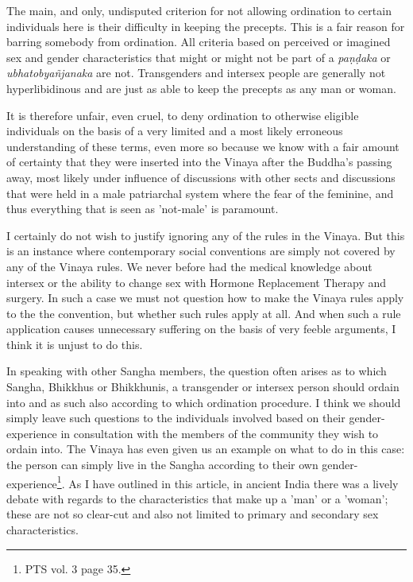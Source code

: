 The main, and only, undisputed criterion for not allowing ordination to certain individuals here is their difficulty in keeping the precepts. This is a fair reason for barring somebody from ordination. All criteria based on perceived or imagined sex and gender characteristics that might or might not be part of a {\em paṇḍaka} or {\em ubhatob­yañ­janaka} are not. Transgenders and intersex people are generally not hyperlibidinous and are just as able to keep the precepts as any man or woman. 

It is therefore unfair, even cruel, to deny ordination to otherwise eligible individuals on the basis of a very limited and a most likely erroneous understanding of these terms, even more so because we know with a fair amount of certainty that they were inserted into the Vinaya after the Buddha's passing away, most likely under influence of discussions with other sects and discussions that were held in a male patriarchal system where the fear of the feminine, and thus everything that is seen as 'not-male' is paramount. 

I certainly do not wish to justify ignoring any of the rules in the Vinaya. But this is an instance where contemporary social conventions are simply not covered by any of the Vinaya rules. We never before had the medical knowledge about intersex or the ability to change sex with Hormone Replacement Therapy and surgery. In such a case we must not question how to make the Vinaya rules apply to the the convention, but whether such rules apply at all. And when such a rule application causes unnecessary suffering on the basis of very feeble arguments, I think it is unjust to do this. 

In speaking with other Sangha members, the question often arises as to which Sangha, Bhikkhus or Bhikkhunis, a transgender or intersex person should ordain into and as such also according to which ordination procedure. I think we should simply leave such questions to the individuals involved based on their gender-experience in consultation with the members of the community they wish to ordain into. The Vinaya has even given us an example on what to do in this case: the person can simply live in the Sangha according to their own gender-experience\footnote{PTS vol. 3 page 35.}. As I have outlined in this article, in ancient India there was a lively debate with regards to the characteristics that make up a 'man' or a 'woman'; these are not so clear-cut and also not limited to primary and secondary sex characteristics. 

